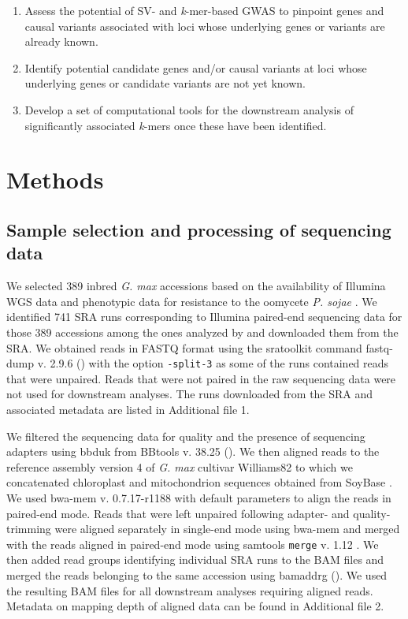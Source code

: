 \begin{enumerate}
	\item Assess the potential of SV- and \emph{k}-mer-based GWAS to
		pinpoint genes and causal variants associated with loci whose
		underlying genes or variants are already known.
	\item Identify potential candidate genes and/or causal variants at loci
		whose underlying genes or candidate variants are not yet known.
	\item Develop a set of computational tools for the downstream analysis
		of significantly associated \emph{k}-mers once these have been
		identified.
\end{enumerate}

\section{Methods}
\label{sv-gwas-methods}

\subsection{Sample selection and processing of sequencing data}
\label{sv-gwas-sequencing-data}

We selected 389 inbred \emph{G. max} accessions based on the availability of
Illumina WGS data and phenotypic data for resistance to the oomycete \emph{P.
sojae} \citep{deronne2022}.  We identified 741 SRA runs corresponding to
Illumina paired-end sequencing data for those 389 accessions among the ones
analyzed by \cite{bayer2021} and downloaded them from the SRA.  We obtained
reads in FASTQ format using the sratoolkit command fastq-dump v. 2.9.6
(\citeauthor[][\url{https://github.com/ncbi/sra-tools}]{sratoolkit}) with the
option \texttt{-\-split-3} as some of the runs contained reads that were
unpaired. Reads that were not paired in the raw sequencing data were not used
for downstream analyses.  The runs downloaded from the SRA and associated
metadata are listed in Additional file 1.

We filtered the sequencing data for quality and the presence of sequencing
adapters using bbduk from BBtools v. 38.25
(\citeauthor[][\url{https://sourceforge.net/projects/bbmap/}]{bbtools}). We
then aligned reads to the reference assembly version 4 of \emph{G. max}
cultivar Williams82 \citep{valliyodan2019} to which we concatenated chloroplast
and mitochondrion sequences obtained from SoyBase \citep{grant2010}. We used
bwa-mem v. 0.7.17-r1188 \citep{li2009-bwa} with default parameters to align the
reads in paired-end mode. Reads that were left unpaired following adapter- and
quality-trimming were aligned separately in single-end mode using bwa-mem and
merged with the reads aligned in paired-end mode using samtools \texttt{merge}
v. 1.12 \citep{li2009-samtools}.  We then added read groups identifying
individual SRA runs to the BAM files and merged the reads belonging to the same
accession using bamaddrg
(\citeauthor[][\url{https://github.com/ekg/bamaddrg}]{bamaddrg}). We used the
resulting BAM files for all downstream analyses requiring aligned reads.
Metadata on mapping depth of aligned data can be found in Additional file 2.

